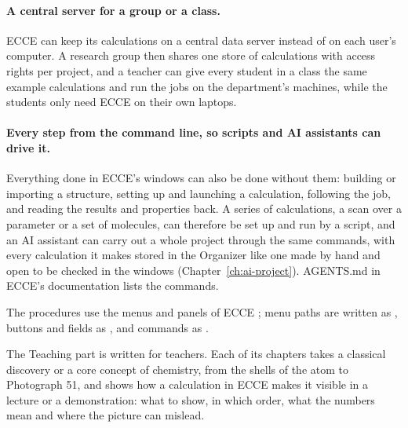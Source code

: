 \paragraph{A central server for a group or a class.} ECCE can keep its calculations on a central data server instead of on each user's computer. A research group then shares one store of calculations with access rights per project, and a teacher can give every student in a class the same example calculations and run the jobs on the department's machines, while the students only need ECCE on their own laptops.

\paragraph{Every step from the command line, so scripts and AI assistants can drive it.} Everything done in ECCE's windows can also be done without them: building or importing a structure, setting up and launching a calculation, following the job, and reading the results and properties back. A series of calculations, a scan over a parameter or a set of molecules, can therefore be set up and run by a script, and an AI assistant can carry out a whole project through the same commands, with every calculation it makes stored in the Organizer like one made by hand and open to be checked in the windows (Chapter~\ref{ch:ai-project}). AGENTS.md in ECCE's documentation lists the commands.

The procedures use the menus and panels of ECCE \ecceversion; menu paths are written as , buttons and fields as , and commands as .


The Teaching part is written for teachers. Each of its chapters takes a classical discovery or a core concept of chemistry, from the shells of the atom to Photograph 51, and shows how a calculation in ECCE makes it visible in a lecture or a demonstration: what to show, in which order, what the numbers mean and where the picture can mislead.
